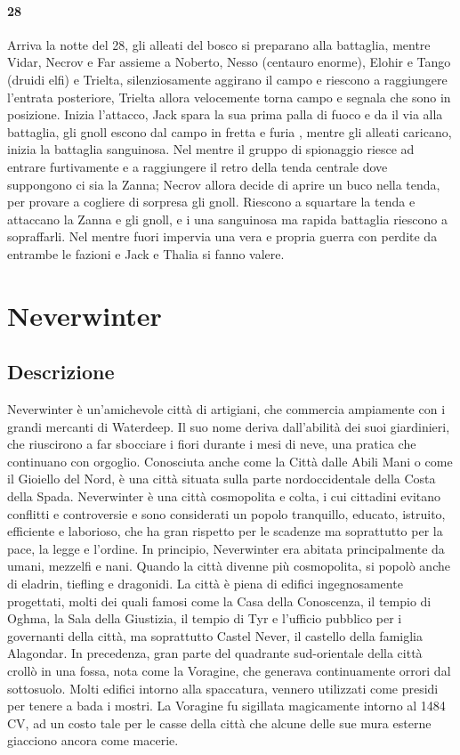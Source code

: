 \documentclass{article}
\begin{document}
      \paragraph{28} Arriva la notte del 28, gli alleati del bosco si preparano alla battaglia, mentre Vidar, Necrov e Far assieme a Noberto, Nesso (centauro enorme), Elohir e Tango (druidi elfi)  e Trielta, silenziosamente aggirano il campo e riescono a raggiungere l'entrata posteriore, Trielta allora velocemente torna campo e segnala che sono in posizione. Inizia l'attacco, Jack spara la sua prima palla di fuoco e da il via alla battaglia, gli gnoll escono dal campo in fretta e furia , mentre gli alleati caricano, inizia la battaglia sanguinosa. Nel mentre il gruppo di spionaggio riesce ad entrare furtivamente e a raggiungere il retro della tenda centrale dove suppongono ci sia la Zanna; Necrov allora decide di aprire un buco nella tenda, per provare a cogliere di sorpresa gli gnoll. Riescono a squartare la tenda e attaccano la Zanna e gli gnoll, e i una sanguinosa ma rapida battaglia riescono a sopraffarli. Nel mentre fuori impervia una vera e propria guerra con perdite da entrambe le fazioni e Jack e Thalia si fanno valere. 
\section{Neverwinter}

          \subsection{Descrizione} Neverwinter è un’amichevole città di artigiani, che commercia ampiamente con i grandi mercanti di Waterdeep. Il suo nome deriva dall’abilità dei suoi giardinieri, che riuscirono a far sbocciare i fiori durante i mesi di neve, una pratica che continuano con orgoglio. Conosciuta anche come la Città dalle Abili Mani o come il Gioiello del Nord, è una città situata sulla parte nordoccidentale della Costa della Spada. Neverwinter è una città cosmopolita e colta, i cui cittadini evitano conflitti e controversie e sono considerati un popolo tranquillo, educato, istruito, efficiente e laborioso, che ha gran rispetto per le scadenze ma soprattutto per la pace, la legge e l’ordine. In principio, Neverwinter era abitata principalmente da umani, mezzelfi e nani. Quando la città divenne più cosmopolita, si popolò anche di eladrin, tiefling e dragonidi.
La città è piena di edifici ingegnosamente progettati, molti dei quali famosi come la Casa della Conoscenza, il tempio di Oghma, la Sala della Giustizia, il tempio di Tyr e l’ufficio pubblico per i governanti della città, ma soprattutto Castel Never, il castello della famiglia Alagondar. In precedenza, gran parte del quadrante sud-orientale della città crollò in una fossa, nota come la Voragine, che generava continuamente orrori dal sottosuolo. Molti edifici intorno alla spaccatura, vennero utilizzati come presidi per tenere a bada i mostri. La Voragine fu sigillata magicamente intorno al 1484 CV, ad un costo tale per le casse della città che alcune delle sue mura esterne giacciono ancora come macerie.
\end{document}

